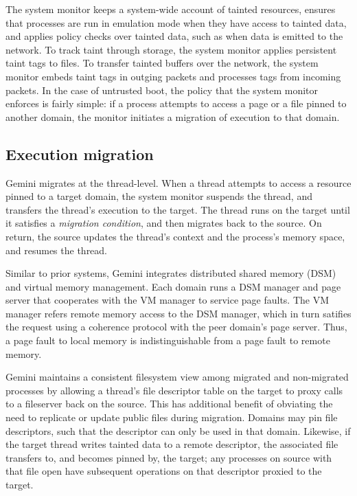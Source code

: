 The system monitor keeps a system-wide account of tainted resources,
ensures that processes are run in emulation mode when they have access to
tainted data, and applies policy checks over tainted data, such as when data is
emitted to the network.
%
To track taint through storage, the system monitor applies persistent
taint tags to files.
%
To transfer tainted buffers over the network, the system monitor embeds taint
tags in outging packets and processes tags from incoming packets.
%
In the case of untrusted boot, the policy that the system monitor enforces is
fairly simple: if a process attempts to access a page or a file pinned to
another domain, the monitor initiates a migration of execution to that domain.


\subsection{Execution migration}

Gemini migrates at the thread-level.
%
When a thread attempts to access a resource pinned to a target domain,
the system monitor suspends the thread, and transfers the
thread's execution to the target.
%
The thread runs on the target until it satisfies a \emph{migration condition},
and then migrates back to the source.
%
On return, the source updates the thread's context and the process's memory
space, and resumes the thread.


%
Similar to prior systems, Gemini integrates distributed shared memory (DSM) and
virtual memory management.
%
Each domain runs a DSM manager and page server that cooperates with the VM
manager to service page faults.
%
The VM manager refers remote memory access to the DSM manager,
which in turn satifies the request using a coherence protocol with the peer
domain's page server.
%
Thus, a page fault to local memory is indistinguishable from a page fault to
remote memory.


%
Gemini maintains a consistent filesystem view among migrated and
non-migrated processes by allowing a thread's file descriptor table on the
target to proxy calls to a fileserver back on the source.
%
This has additional benefit of obviating the need to replicate or update
public files during migration.
%
Domains may pin file descriptors, such that the descriptor can only be used
in that domain.
%
Likewise, if the target thread writes tainted data to a remote descriptor, the
associated file transfers to, and becomes pinned by, the target; any processes
on source with that file open have subsequent operations on that descriptor
proxied to the target.


